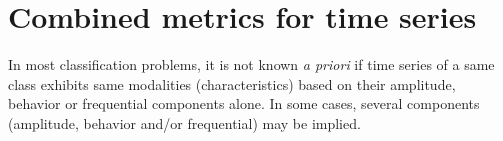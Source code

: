 \clearpage
\newpage
\section{Combined metrics for time series}
In most classification problems, it is not known \textit{a priori} if time series of a same class exhibits same modalities (characteristics) based on their amplitude, behavior or frequential components alone. In some cases, several components (amplitude, behavior and/or frequential) may be implied. 

